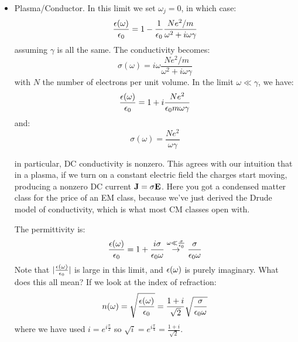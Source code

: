 \begin{itemize}
    \item Plasma/Conductor. In this limit we set $\omega_j = 0$, in which case:
    \begin{equation}
        \frac{\epsilon(\omega)}{\epsilon_0} = 1 - \frac{1}{\epsilon_0}\frac{Ne^2/m}{\omega^2 + i\omega\gamma}
    \end{equation}
    assuming $\gamma$ is all the same. The conductivity becomes:
    \begin{equation}
        \sigma(\omega) = i\omega\frac{Ne^2/m}{\omega^2 + i\omega\gamma}
    \end{equation}
    with $N$ the number of electrons per unit volume. In the limit $\omega \ll \gamma$, we have:
    \begin{equation}
        \frac{\epsilon(\omega)}{\epsilon_0} = 1 + i\frac{Ne^2}{\epsilon_0m \omega\gamma}
    \end{equation}
    and:
    \begin{equation}
        \sigma(\omega) = \frac{Ne^2}{\omega\gamma}
    \end{equation}

    in particular, DC conductivity is nonzero. This agrees with our intuition that in a plasma, if we turn on a constant electric field the charges start moving, producing a nonzero DC current $\mathbf{J} = \sigma \mathbf{E}$. Here you got a condensed matter class for the price of an EM class, because we've just derived the Drude model of conductivity, which is what most CM classes open with.

    The permittivity is:
    \begin{equation}
        \frac{\epsilon(\omega)}{\epsilon_0} = 1 + \frac{i\sigma}{\epsilon_0 \omega} \stackrel{\omega\ll \frac{\sigma}{\epsilon_0}}{\to} \frac{\sigma}{\epsilon_0\omega}
    \end{equation}
    Note that $\lvert \frac{\epsilon(\omega)}{\epsilon_0} \rvert$ is large in this limit, and $\epsilon(\omega)$ is purely imaginary. What does this all mean? If we look at the index of refraction:
    \begin{equation}
        n(\omega) = \sqrt{\frac{\epsilon(\omega)}{\epsilon_0}} = \frac{1+i}{\sqrt{2}}\sqrt{\frac{\sigma}{\epsilon_0\omega}}
    \end{equation}
    where we have used $i = e^{i\frac{\pi}{2}}$ so $\sqrt{i} = e^{i\frac{\pi}{4}} = \frac{1 + i}{\sqrt{2}}$.


\end{itemize}
